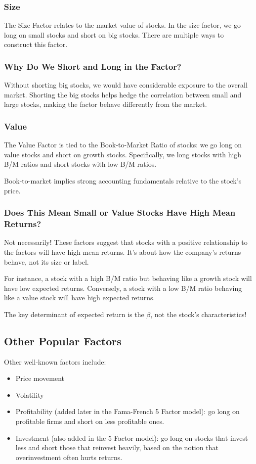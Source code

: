 \documentclass{article}
\begin{document}
\subsubsection{Size}
The Size Factor relates to the market value of stocks. In the size factor, we go long on small stocks and short on big stocks. There are multiple ways to construct this factor.

\subsubsection{Why Do We Short and Long in the Factor?}
Without shorting big stocks, we would have considerable exposure to the overall market. Shorting the big stocks helps hedge the correlation between small and large stocks, making the factor behave differently from the market.

\subsubsection{Value}
The Value Factor is tied to the Book-to-Market Ratio of stocks: we go long on value stocks and short on growth stocks. Specifically, we long stocks with high B/M ratios and short stocks with low B/M ratios.

Book-to-market implies strong accounting fundamentals relative to the stock's price.

\subsubsection{Does This Mean Small or Value Stocks Have High Mean Returns?}
Not necessarily! These factors suggest that stocks with a positive relationship to the factors will have high mean returns. It’s about how the company’s returns behave, not its size or label.

For instance, a stock with a high B/M ratio but behaving like a growth stock will have low expected returns. Conversely, a stock with a low B/M ratio behaving like a value stock will have high expected returns.

The key determinant of expected return is the $\beta$, not the stock's characteristics!

\subsection{Other Popular Factors}
Other well-known factors include:
\begin{itemize}
    \item Price movement
    \item Volatility
    \item Profitability (added later in the Fama-French 5 Factor model): go long on profitable firms and short on less profitable ones.
    \item Investment (also added in the 5 Factor model): go long on stocks that invest less and short those that reinvest heavily, based on the notion that overinvestment often hurts returns.
\end{itemize}
\end{document}
